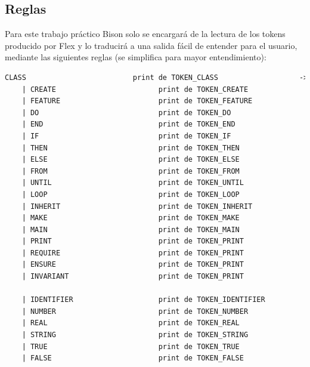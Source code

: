 \documentclass[a4paper,12pt]{article}
\begin{document}
\subsection{Reglas}
Para este trabajo práctico Bison solo se encargará de la lectura de los tokens producido por Flex y lo traducirá a una salida fácil de entender para el usuario, mediante las siguientes reglas (se simplifica para mayor entendimiento):
\begin{lstlisting}[language=Eiffel, style=myeiffel]
      CLASS                         print de TOKEN_CLASS                   -> + Lexema asociado
    | CREATE                        print de TOKEN_CREATE                  -> + Lexema asociado
    | FEATURE                       print de TOKEN_FEATURE                 -> + Lexema asociado
    | DO                            print de TOKEN_DO                      -> + Lexema asociado
    | END                           print de TOKEN_END                     -> + Lexema asociado
    | IF                            print de TOKEN_IF                      -> + Lexema asociado
    | THEN                          print de TOKEN_THEN                    -> + Lexema asociado
    | ELSE                          print de TOKEN_ELSE                    -> + Lexema asociado
    | FROM                          print de TOKEN_FROM                    -> + Lexema asociado
    | UNTIL                         print de TOKEN_UNTIL                   -> + Lexema asociado
    | LOOP                          print de TOKEN_LOOP                    -> + Lexema asociado
    | INHERIT                       print de TOKEN_INHERIT                 -> + Lexema asociado
    | MAKE                          print de TOKEN_MAKE                    -> + Lexema asociado
    | MAIN                          print de TOKEN_MAIN                    -> + Lexema asociado
    | PRINT                         print de TOKEN_PRINT                   -> + Lexema asociado
    | REQUIRE                       print de TOKEN_PRINT                   -> + Lexema asociado
    | ENSURE                        print de TOKEN_PRINT                   -> + Lexema asociado
    | INVARIANT                     print de TOKEN_PRINT                   -> + Lexema asociado

    | IDENTIFIER                    print de TOKEN_IDENTIFIER              -> + Lexema asociado
    | NUMBER                        print de TOKEN_NUMBER                  -> + Lexema asociado
    | REAL                          print de TOKEN_REAL                    -> + Lexema asociado
    | STRING                        print de TOKEN_STRING                  -> + Lexema asociado
    | TRUE                          print de TOKEN_TRUE                    -> + Lexema asociado
    | FALSE                         print de TOKEN_FALSE                   -> + Lexema asociado


\end{lstlisting}
\end{document}
